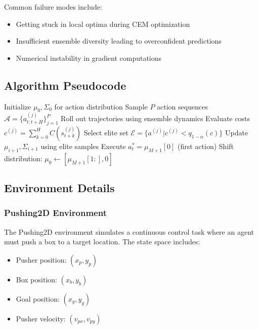 \documentclass[10pt,twocolumn,letterpaper]{article}
\begin{document}
Common failure modes include:
\begin{itemize}
\item Getting stuck in local optima during CEM optimization
\item Insufficient ensemble diversity leading to overconfident predictions
\item Numerical instability in gradient computations
\end{itemize}

\subsection{Algorithm Pseudocode}

\begin{algorithm}
\caption{CEM-MPC with Ensemble Dynamics}
\begin{algorithmic}[1]
\STATE Initialize $\mu_0, \Sigma_0$ for action distribution
        \STATE Sample $P$ action sequences $\mathcal{A} = \{a_{t:t+H}^{(j)}\}_{j=1}^P$
        \STATE Roll out trajectories using ensemble dynamics
        \STATE Evaluate costs $c^{(j)} = \sum_{k=0}^H C(s_{t+k}^{(j)})$
        \STATE Select elite set $\mathcal{E} = \{a^{(j)} | c^{(j)} < q_{1-\alpha}(c)\}$
        \STATE Update $\mu_{i+1}, \Sigma_{i+1}$ using elite samples
    \ENDFOR
    \STATE Execute $a_t^* = \mu_{M+1}[0]$ (first action)
    \STATE Shift distribution: $\mu_0 \leftarrow [\mu_{M+1}[1:], 0]$
\ENDFOR
\end{algorithmic}
\end{algorithm}

\subsection{Environment Details}

\subsubsection{Pushing2D Environment}

The Pushing2D environment simulates a continuous control task where an agent must push a box to a target location. The state space includes:
\begin{itemize}
\item Pusher position: $(x_p, y_p)$
\item Box position: $(x_b, y_b)$
\item Goal position: $(x_g, y_g)$
\item Pusher velocity: $(v_{px}, v_{py})$
\end{itemize}
\end{document}
